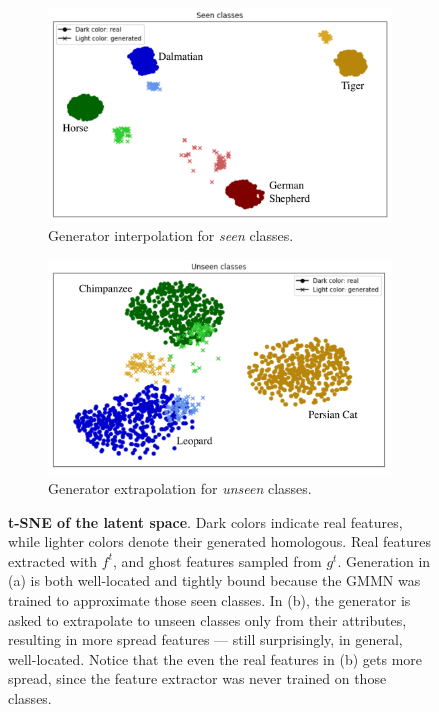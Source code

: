 \begin{figure}[httb!]
    \centering
    \begin{subfigure}{.45\textwidth}
        \centering
        \includegraphics[width=\linewidth]{images/ghost/tsne_seen.pdf}
        \caption{Generator interpolation for \textit{seen} classes.}
        \label{fig:ghost_tsne_seen}
    \end{subfigure}%
    \hspace{1em}
    \begin{subfigure}{.45\textwidth}
        \centering
        \includegraphics[width=\linewidth]{images/ghost/tsne_unseen.pdf}
        \caption{Generator extrapolation for \textit{unseen} classes.}
        \label{fig:ghost_tsne_unseen}
    \end{subfigure}
    \caption{\textbf{t-SNE of the latent space}. Dark colors indicate real features, while lighter colors denote their generated homologous. Real features extracted with $f^t$, and ghost features sampled from $g^t$. Generation in (a) is both well-located and tightly bound because the GMMN was trained to approximate those seen classes. In (b), the generator is asked to extrapolate to unseen classes only from their attributes, resulting in more spread features — still surprisingly, in general, well-located. Notice that the even the real features in (b) gets more spread, since the feature extractor was never trained on those classes.}
    \label{fig:ghost_tsne}
\end{figure}
